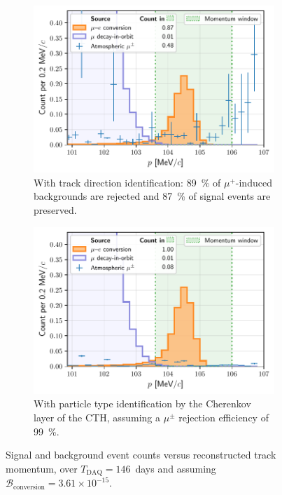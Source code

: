 \begin{figure}
    \centering
    \begin{subfigure}{0.48\textwidth}
        \centering
        \includegraphics[width=\textwidth]{chapter6/thesis_conversion_search_momentum_distribution_withcuts_with_mu+_ID_dp=0.1_v3.pdf}
        \caption{With track direction identification: \SI{89}{\percent} of
        $\mu^+$-induced backgrounds are rejected and \SI{87}{\percent} of signal events
        are preserved.}
        \label{fig:spectrum_with_direction_id}
    \end{subfigure}
    \hfill
    \begin{subfigure}{0.48\textwidth}
        \centering
        \includegraphics[width=\textwidth]{chapter6/thesis_conversion_search_momentum_distribution_withcuts_with_mu+-.pdf}
        \caption{With particle type identification by the Cherenkov layer of the
        CTH, assuming a $\mu^{\pm}$ rejection efficiency of \SI{99}{\percent}.}
        \label{fig:spectrum_with_cherenkov_pid}
    \end{subfigure}
        
    \caption{Signal and background event counts versus reconstructed track
    momentum, over $T_\mathrm{DAQ}=146$~days and assuming
    $\mathcal{B}_\mathrm{conversion} = 3.61\times 10^{-15}$. }
    \label{fig:lin_spectra}
\end{figure}


